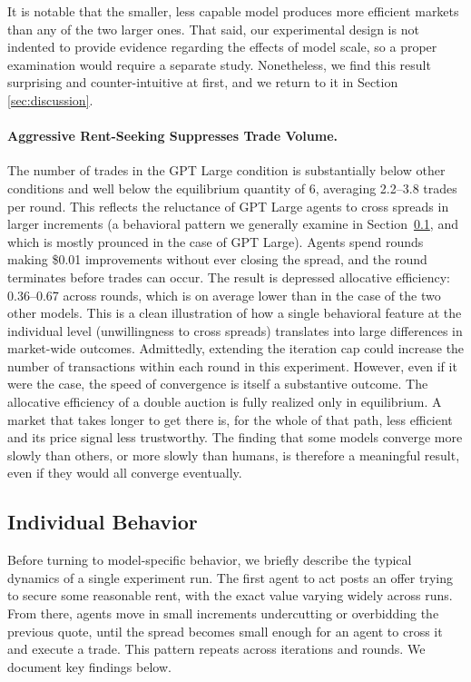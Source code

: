 \documentclass[letterpaper]{article} %
\begin{document}
It is notable that the smaller, less capable model produces more efficient markets than any of the two larger ones. That said, our experimental design is not indented to provide evidence regarding the effects of model scale, so a proper examination would require a separate study. Nonetheless, we find this result surprising and counter-intuitive at first, and we return to it in Section \ref{sec:discussion}. 
%

\paragraph{Aggressive Rent-Seeking Suppresses Trade Volume.}
The number of trades in the GPT Large condition is substantially below other conditions and well below the equilibrium quantity of 6, averaging 2.2–3.8 trades per round. This reflects the reluctance of GPT Large agents to cross spreads in larger increments (a behavioral pattern we generally examine in Section~\ref{sec:individual}, and which is mostly prounced in the case of GPT Large). Agents spend rounds making \$0.01 improvements without ever closing the spread, and the round terminates before trades can occur. The result is depressed allocative efficiency: 0.36–0.67 across rounds, which is on average lower than in the case of the two other models. This is a clean illustration of how a single behavioral feature at the individual level (unwillingness to cross spreads) translates into large differences in market-wide outcomes. Admittedly, extending the iteration cap could increase the number of transactions within each round in this experiment. However, even if it were the case, the speed of convergence is itself a substantive outcome. The allocative efficiency of a double auction is fully realized only in equilibrium. A market that takes longer to get there is, for the whole of that path, less efficient and its price signal less trustworthy. The finding that some models converge more slowly than others, or more slowly than humans, is therefore a meaningful result, even if they would all converge eventually.


\subsection{Individual Behavior}
\label{sec:individual}
Before turning to model-specific behavior, we briefly describe the typical dynamics of a single experiment run. The first agent to act posts an offer trying to secure some reasonable rent, with the exact value varying widely across runs. From there, agents move in small increments undercutting or overbidding the previous quote, until the spread becomes small enough for an agent to cross it and execute a trade. This pattern repeats across iterations and rounds. We document key findings  below.
\end{document}
